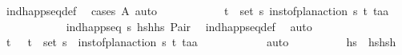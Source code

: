 \begin{isabellebody}
\ ind{\isacharunderscore}{\kern0pt}happ{\isacharunderscore}{\kern0pt}seq{\isacharunderscore}{\kern0pt}def\ \isamarkupfalse%
\ {\isacharparenleft}{\kern0pt}cases\ A{\isacharparenright}{\kern0pt}\ auto\isanewline
\ \ \ \ \ \ \ \ \isamarkupfalse%
\ \isamarkupfalse%
\ {\isachardoublequoteopen}{\isasymexists}{\isacharparenleft}{\kern0pt}t\isactrlsub {\isasympi}{\isacharcomma}{\kern0pt}{\isasympi}{\isacharparenright}{\kern0pt}\ {\isasymin}\ set\ {\isasympi}s{\isachardot}{\kern0pt}\ inst{\isacharunderscore}{\kern0pt}of{\isacharunderscore}{\kern0pt}plan{\isacharunderscore}{\kern0pt}action\ {\isasympi}s\ {\isacharparenleft}{\kern0pt}t\isactrlsub {\isasympi}{\isacharcomma}{\kern0pt}{\isasympi}{\isacharparenright}{\kern0pt}\ {\isacharparenleft}{\kern0pt}t\isactrlsub a{\isacharcomma}{\kern0pt}a{\isacharparenright}{\kern0pt}{\isachardoublequoteclose}\isanewline
\ \ \ \ \ \ \ \ \ \ \isamarkupfalse%
\ {\isacartoucheopen}ind{\isacharunderscore}{\kern0pt}happ{\isacharunderscore}{\kern0pt}seq\ {\isasympi}s\ {\isacharparenleft}{\kern0pt}hs{\isacharprime}{\kern0pt}{\isacharat}{\kern0pt}h{\isacharhash}{\kern0pt}hs{\isacharparenright}{\kern0pt}{\isacartoucheclose}\ Pair\ \isamarkupfalse%
\ ind{\isacharunderscore}{\kern0pt}happ{\isacharunderscore}{\kern0pt}seq{\isacharunderscore}{\kern0pt}def\ \isamarkupfalse%
\ auto\isanewline
\ \ \ \ \ \ \ \ \isamarkupfalse%
\ \isamarkupfalse%
\ t\isactrlsub {\isasympi}\ {\isasympi}\ \ {\isachardoublequoteopen}{\isacharparenleft}{\kern0pt}t\isactrlsub {\isasympi}{\isacharcomma}{\kern0pt}{\isasympi}{\isacharparenright}{\kern0pt}\ {\isasymin}\ set\ {\isasympi}s{\isachardoublequoteclose}\ \ {\isachardoublequoteopen}inst{\isacharunderscore}{\kern0pt}of{\isacharunderscore}{\kern0pt}plan{\isacharunderscore}{\kern0pt}action\ {\isasympi}s\ {\isacharparenleft}{\kern0pt}t\isactrlsub {\isasympi}{\isacharcomma}{\kern0pt}{\isasympi}{\isacharparenright}{\kern0pt}\ {\isacharparenleft}{\kern0pt}t\isactrlsub a{\isacharcomma}{\kern0pt}a{\isacharparenright}{\kern0pt}{\isachardoublequoteclose}\isanewline
\ \ \ \ \ \ \ \ \ \ \isamarkupfalse%
\ auto\isanewline
\ \ \ \ \ \ \ \ \isamarkupfalse%
\ hs{\isacharprime}{\kern0pt}{\isacharprime}{\kern0pt}\ \ {\isachardoublequoteopen}hs{\isacharprime}{\kern0pt}{\isacharprime}{\kern0pt}{\isacharequal}{\kern0pt}hs{\isacharprime}{\kern0pt}{\isacharat}{\kern0pt}{\isacharbrackleft}{\kern0pt}h{\isacharbrackright}{\kern0pt}{\isachardoublequoteclose}\isanewline

\end{isabellebody}

